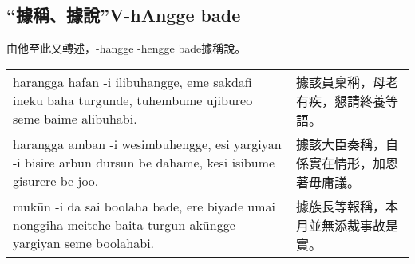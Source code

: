 \documentclass{article}
\begin{document}
\subsection{“據稱、據說”V-hAngge bade}
\noindent 由他至此又轉述，-hangge -hengge bade據稱說。
\begin{center}
    \begin{tabularx}{\textwidth}{XX}
        harangga hafan -i ilibuhangge, eme sakdafi ineku baha turgunde, tuhembume ujibureo seme baime alibuhabi. & 據該員稟稱，母老有疾，懇請終養等語。\\
        harangga amban -i wesimbuhengge, esi yargiyan -i bisire arbun dursun be dahame, kesi isibume gisurere be joo. & 據該大臣奏稱，自係實在情形，加恩著毋庸議。\\
        muk\={u}n -i da sai boolaha bade, ere biyade umai nonggiha meitehe baita turgun ak\={u}ngge yargiyan seme boolahabi. & 據族長等報稱，本月並無添裁事故是實。
    \end{tabularx}
\end{center}
\end{document}
